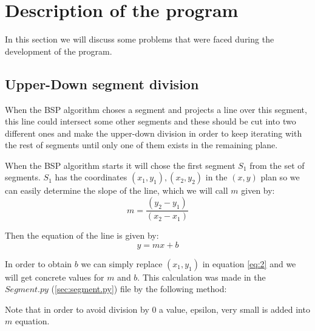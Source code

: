 \documentclass{article}
\begin{document}
\section{Description of the program}\label{sec:prog_description}

In this section we will discuss some problems that were faced during the development of the program.

\subsection{Upper-Down segment division}
When the BSP algorithm choses a segment and projects a line over this segment, this line could intersect some other segments and these should be cut
into two different ones and make the upper-down division in order to keep iterating with the rest of segments until only one of them exists in the remaining plane.

When the BSP algorithm starts it will chose the first segment $S_1$ from the set of segments. $S_1$
has the coordinates $(x_1, y_1), (x_2, y_2)$ in the $(x,y)$ plan so we can easily determine the slope of the line, which we will call $m$ given by:
\begin{equation}\label{eq:1}
m = \frac{(y_2 - y_1)} {(x_2 - x_1)}
\end{equation}

Then the equation of the line is given by:
\begin{equation}\label{eq:2}
y = mx + b
\end{equation}

In order to obtain $b$ we can simply replace $(x_1,y_1)$ in equation \ref{eq:2} and we will get concrete values for $m$ and $b$. This calculation was made in the $Segment.py$ (\ref{sec:segment.py}) file by the following method:


Note that in order to avoid division by 0 a value, epsilon, very small is added into $m$ equation.
\end{document}
